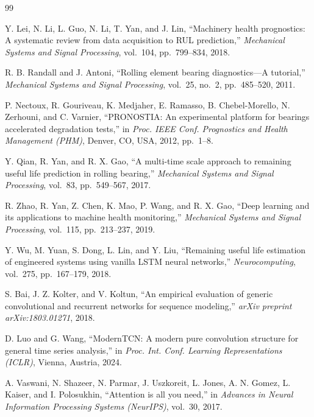 \documentclass{ieeeaccess}
\begin{document}
{%
\begin{thebibliography}{99}

Y. Lei, N. Li, L. Guo, N. Li, T. Yan, and J. Lin,
``Machinery health prognostics: A systematic review from data acquisition to RUL prediction,''
\textit{Mechanical Systems and Signal Processing}, vol.~104, pp.~799--834, 2018.

R. B. Randall and J. Antoni,
``Rolling element bearing diagnostics---A tutorial,''
\textit{Mechanical Systems and Signal Processing}, vol.~25, no.~2, pp.~485--520, 2011.

P. Nectoux, R. Gouriveau, K. Medjaher, E. Ramasso, B. Chebel-Morello, N. Zerhouni, and C. Varnier,
``PRONOSTIA: An experimental platform for bearings accelerated degradation tests,''
in \textit{Proc. IEEE Conf. Prognostics and Health Management (PHM)}, Denver, CO, USA, 2012, pp.~1--8.

Y. Qian, R. Yan, and R. X. Gao,
``A multi-time scale approach to remaining useful life prediction in rolling bearing,''
\textit{Mechanical Systems and Signal Processing}, vol.~83, pp.~549--567, 2017.

R. Zhao, R. Yan, Z. Chen, K. Mao, P. Wang, and R. X. Gao,
``Deep learning and its applications to machine health monitoring,''
\textit{Mechanical Systems and Signal Processing}, vol.~115, pp.~213--237, 2019.

Y. Wu, M. Yuan, S. Dong, L. Lin, and Y. Liu,
``Remaining useful life estimation of engineered systems using vanilla LSTM neural networks,''
\textit{Neurocomputing}, vol.~275, pp.~167--179, 2018.

S. Bai, J. Z. Kolter, and V. Koltun,
``An empirical evaluation of generic convolutional and recurrent networks for sequence modeling,''
\textit{arXiv preprint arXiv:1803.01271}, 2018.

D. Luo and G. Wang,
``ModernTCN: A modern pure convolution structure for general time series analysis,''
in \textit{Proc. Int. Conf. Learning Representations (ICLR)}, Vienna, Austria, 2024.

A. Vaswani, N. Shazeer, N. Parmar, J. Uszkoreit, L. Jones, A. N. Gomez, L. Kaiser, and I. Polosukhin,
``Attention is all you need,''
in \textit{Advances in Neural Information Processing Systems (NeurIPS)}, vol.~30, 2017.


\end{thebibliography}}
\end{document}
